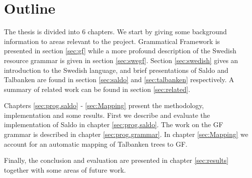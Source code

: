 \documentclass{report}
\begin{document}
\newpage %
\section{Outline}
The thesis is divided into 6 chapters. We start by giving some background
information to areas relevant to the project. %
Grammatical Framework is presented in section \ref{sec:gf} while a more profound
description of the Swedish resource grammar is given in section \ref{sec:swegf}.
Section \ref{sec:swedish} gives an introduction to the Swedish language, and
brief presentations of Saldo and Talbanken are found in section \ref{sec:saldo} and
\ref{sec:talbanken} respectively.
A summary of related work can be found in section \ref{sec:related}.

Chapters \ref{sec:prog.saldo} - \ref{sec:Mapping} present the methodology,
implementation and some results. First we describe and evaluate the implementation
of Saldo in chapter \ref{sec:prog.saldo}. The work on the GF grammar is described in
chapter \ref{sec:prog.grammar}.
In chapter \ref{sec:Mapping} we account for an automatic mapping of Talbanken
trees to GF. %


Finally, the conclusion and evaluation are
presented in chapter \ref{sec:results} together with some areas of future work.




\end{document}
